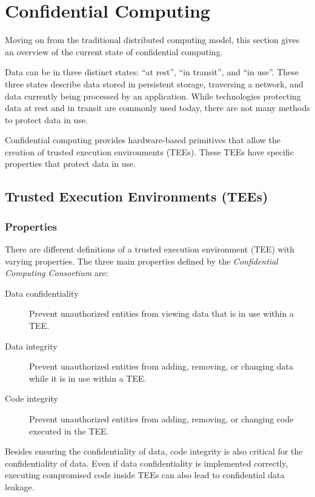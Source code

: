 \section{Confidential Computing}
\label{sec:confidential-computing}

Moving on from the traditional distributed computing model, this section gives
an overview of the current state of confidential computing.

Data can be in three distinct states: ``at rest'', ``in transit'', and ``in
use''. These three states describe data stored in persistent storage, traversing
a network, and data currently being processed by an application. While
technologies protecting data at rest and in transit are commonly used today,
there are not many methods to protect data in use.

Confidential computing provides hardware-based primitives that allow the
creation of trusted execution environments (TEEs). These TEEs have specific
properties that protect data in use.

\subsection{Trusted Execution Environments (TEEs)}
\label{sec:tee}

\subsubsection{Properties}

There are different definitions of a trusted execution environment (TEE) with
varying properties. The three main properties defined by the
\textit{Confidential Computing Consortium} \cite{ccc2022technicalanalysis} are:

\begin{description}
  \item[Data confidentiality]
    Prevent unauthorized entities from viewing data that is in use within a TEE.
  \item[Data integrity]
    Prevent unauthorized entities from adding, removing, or changing data while
    it is in use within a TEE.
  \item[Code integrity]
    Prevent unauthorized entities from adding, removing, or changing code
    executed in the TEE.
\end{description}

Besides ensuring the confidentiality of data, code integrity is also critical
for the confidentiality of data. Even if data confidentiality is implemented
correctly, executing compromised code inside TEEs can also lead to confidential
data leakage.

